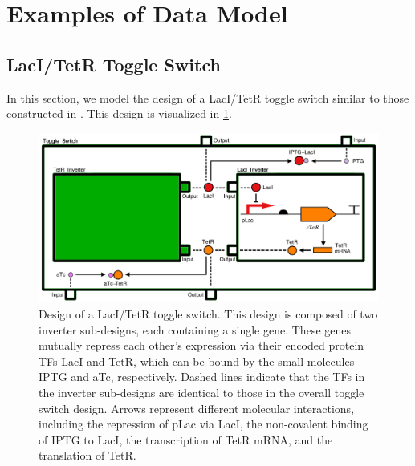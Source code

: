 \section{Examples of Data Model}
\label{sec:examples}

\subsection{LacI/TetR Toggle Switch}



In this section, we model the design of a LacI/TetR toggle switch similar to those constructed in \cite{Gardner2000}. This design is visualized in \ref{images:toggleswitch_modular}. 

\begin{figure}[ht]
\begin{center}
\includegraphics[scale=0.4]{images/toggleswitch_modular}
\caption[]{Design of a LacI/TetR toggle switch. This design is composed of two inverter sub-designs, each containing a single gene. These genes mutually repress each other's expression via their encoded protein TFs LacI and TetR, which can be bound by the small molecules IPTG and aTc, respectively. Dashed lines indicate that the TFs in the inverter sub-designs are identical to those in the overall toggle switch design. Arrows represent different molecular interactions, including the repression of pLac via LacI, the non-covalent binding of IPTG to LacI, the transcription of TetR mRNA, and the translation of TetR.}
\label{images:toggleswitch_modular}
\end{center}
\end{figure}

